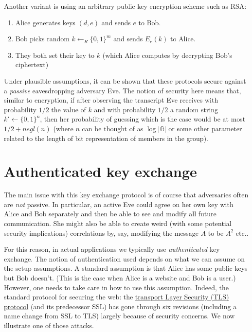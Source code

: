 Another variant is using an arbitrary public key encryption scheme such
as RSA:

\begin{enumerate}
\def\labelenumi{\arabic{enumi}.}
\item
  Alice generates keys \((d,e)\) and sends \(e\) to Bob.
\item
  Bob picks random \(k \leftarrow_R\{0,1\}^m\) and sends \(E_e(k)\) to
  Alice.
\item
  They both set their key to \(k\) (which Alice computes by decrypting
  Bob's ciphertext)
\end{enumerate}

Under plausible assumptions, it can be shown that these protocols secure
against a \emph{passive} eavesdropping adversary Eve. The notion of
security here means that, similar to encryption, if after observing the
transcript Eve receives with probability \(1/2\) the value of \(k\) and
with probability \(1/2\) a random string \(k'\gets\{0,1\}^n\), then her
probability of guessing which is the case would be at most
\(1/2+negl(n)\) (where \(n\) can be thought of as \(\log |\mathbb{G}|\)
or some other parameter related to the length of bit representation of
members in the group).

\section{Authenticated key exchange}\label{Authenticated-key-exchang}

The main issue with this key exchange protocol is of course that
adversaries often are \emph{not} passive. In particular, an active Eve
could agree on her own key with Alice and Bob separately and then be
able to see and modify all future communication. She might also be able
to create weird (with some potential security implications) correlations
by, say, modifying the message \(A\) to be \(A^2\) etc..

For this reason, in actual applications we typically use
\emph{authenticated} key exchange. The notion of authentication used
depends on what we can assume on the setup assumptions. A standard
assumption is that Alice has some public keys but Bob doesn't. (This is
the case when Alice is a website and Bob is a user.) However, one needs
to take care in how to use this assumption. Indeed, the standard
protocol for securing the web: the
\href{https://goo.gl/md9Bsa}{transport Layer Security (TLS) protocol}
(and its predecessor SSL) has gone through six revisions (including a
name change from SSL to TLS) largely because of security concerns. We
now illustrate one of those attacks.


